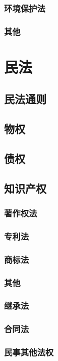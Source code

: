 \documentclass[UTF8]{../ApplicationUniverse}
\begin{document}
        \subsubsection{环境保护法}
        \subsubsection{其他}

\section{民法}
    \subsection{民法通则}
    \subsection{物权}
    \subsection{债权}
    \subsection{知识产权}
        \subsubsection{著作权法}
        \subsubsection{专利法}
        \subsubsection{商标法}
        \subsubsection{其他}
    \subsubsection{继承法}
    \subsubsection{合同法}
    \subsubsection{民事其他法权}
\end{document}
